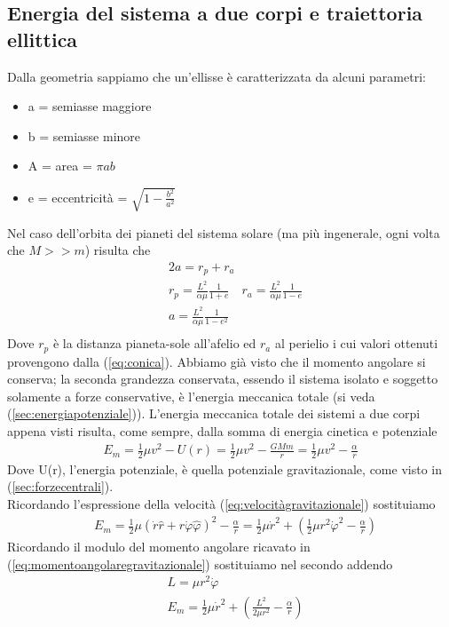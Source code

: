 \subsection{Energia del sistema a due corpi e traiettoria ellittica}\label{sec:energiasistema2corpi}
Dalla geometria sappiamo che un'ellisse è caratterizzata da alcuni parametri:
\begin{itemize}
\item a = semiasse maggiore
\item b = semiasse minore
\item A = area = $\pi a b$
\item e = eccentricità = $\sqrt{1-\frac{b^2}{a^2}}$
\end{itemize}
Nel caso dell'orbita dei pianeti del sistema solare (ma più ingenerale, ogni volta che $M >> m$) risulta che
\begin{align*}
&2a = r_p+r_a\\
&r_p = \frac{L^2}{\alpha\mu}\frac{1}{1+e} \quad r_a = \frac{L^2}{\alpha\mu}\frac{1}{1-e}\\
&a = \frac{L^2}{\alpha\mu}\frac{1}{1-e^2}\\
\end{align*}
Dove $r_p$ è la distanza pianeta-sole all'afelio ed $r_a$ al perielio i cui valori ottenuti provengono dalla (\ref{eq:conica}). Abbiamo già visto che il momento angolare si conserva; la seconda grandezza conservata, essendo il sistema isolato e soggetto solamente a forze conservative, è l'energia meccanica totale (si veda (\ref{sec:energiapotenziale})). L'energia meccanica totale dei sistemi a due corpi appena visti risulta, come sempre, dalla somma di energia cinetica e potenziale
 \begin{align*}
 	E_m=\frac{1}{2}\mu v^2 - U(r) = \frac{1}{2}\mu v^2 -\frac{GMm}{r} = \frac{1}{2}\mu v^2 -\frac{\alpha}{r}
 \end{align*}
Dove U(r), l'energia potenziale, è quella potenziale gravitazionale, come visto in (\ref{sec:forzecentrali}).\\
Ricordando l'espressione della velocità (\ref{eq:velocitàgravitazionale}) sostituiamo
\begin{align*}
	&E_m= \frac{1}{2}\mu (\dot{r}\hat{r}+r\dot{\varphi}\hat{\varphi})^2 -\frac{\alpha}{r}= \frac{1}{2}\mu \dot{r}^2+ (\frac{1}{2}\mu r^2\dot{\varphi}^2 -\frac{\alpha}{r})
\end{align*}
Ricordando il modulo del momento angolare ricavato in (\ref{eq:momentoangolaregravitazionale}) sostituiamo nel secondo addendo
\begin{align*}
	&L = \mu r^2 \dot{\varphi}\\
	&E_m= \frac{1}{2}\mu \dot{r}^2+ (\frac{L^2}{2\mu r^2} -\frac{\alpha}{r})
\end{align*}
